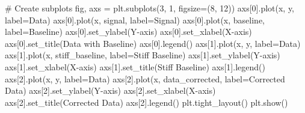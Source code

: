 \documentclass[
  letterpaper,
  DIV=11,
  numbers=noendperiod]{scrreprt}
\newenvironment{Shaded}{\begin{snugshade}}{\end{snugshade}}
\newcommand{\CommentTok}[1]{\textcolor[rgb]{0.37,0.37,0.37}{#1}}
\newcommand{\DecValTok}[1]{\textcolor[rgb]{0.68,0.00,0.00}{#1}}
\newcommand{\NormalTok}[1]{\textcolor[rgb]{0.00,0.23,0.31}{#1}}
\newcommand{\OperatorTok}[1]{\textcolor[rgb]{0.37,0.37,0.37}{#1}}
\newcommand{\StringTok}[1]{\textcolor[rgb]{0.13,0.47,0.30}{#1}}
\begin{document}
\begin{Shaded}
\begin{Highlighting}[]
\CommentTok{\# Create subplots}
\NormalTok{fig, axs }\OperatorTok{=}\NormalTok{ plt.subplots(}\DecValTok{3}\NormalTok{, }\DecValTok{1}\NormalTok{, figsize}\OperatorTok{=}\NormalTok{(}\DecValTok{8}\NormalTok{, }\DecValTok{12}\NormalTok{))}
\NormalTok{axs[}\DecValTok{0}\NormalTok{].plot(x, y, label}\OperatorTok{=}\StringTok{\textquotesingle{}Data\textquotesingle{}}\NormalTok{)}
\NormalTok{axs[}\DecValTok{0}\NormalTok{].plot(x, signal, label}\OperatorTok{=}\StringTok{\textquotesingle{}Signal\textquotesingle{}}\NormalTok{)}
\NormalTok{axs[}\DecValTok{0}\NormalTok{].plot(x, baseline, label}\OperatorTok{=}\StringTok{\textquotesingle{}Baseline\textquotesingle{}}\NormalTok{)}
\NormalTok{axs[}\DecValTok{0}\NormalTok{].set\_ylabel(}\StringTok{\textquotesingle{}Y{-}axis\textquotesingle{}}\NormalTok{)}
\NormalTok{axs[}\DecValTok{0}\NormalTok{].set\_xlabel(}\StringTok{\textquotesingle{}X{-}axis\textquotesingle{}}\NormalTok{)}
\NormalTok{axs[}\DecValTok{0}\NormalTok{].set\_title(}\StringTok{\textquotesingle{}Data with Baseline\textquotesingle{}}\NormalTok{)}
\NormalTok{axs[}\DecValTok{0}\NormalTok{].legend()}
\NormalTok{axs[}\DecValTok{1}\NormalTok{].plot(x, y, label}\OperatorTok{=}\StringTok{\textquotesingle{}Data\textquotesingle{}}\NormalTok{)}
\NormalTok{axs[}\DecValTok{1}\NormalTok{].plot(x, stiff\_baseline, label}\OperatorTok{=}\StringTok{\textquotesingle{}Stiff Baseline\textquotesingle{}}\NormalTok{)}
\NormalTok{axs[}\DecValTok{1}\NormalTok{].set\_ylabel(}\StringTok{\textquotesingle{}Y{-}axis\textquotesingle{}}\NormalTok{)}
\NormalTok{axs[}\DecValTok{1}\NormalTok{].set\_xlabel(}\StringTok{\textquotesingle{}X{-}axis\textquotesingle{}}\NormalTok{)}
\NormalTok{axs[}\DecValTok{1}\NormalTok{].set\_title(}\StringTok{\textquotesingle{}Stiff Baseline\textquotesingle{}}\NormalTok{)}
\NormalTok{axs[}\DecValTok{1}\NormalTok{].legend()}
\NormalTok{axs[}\DecValTok{2}\NormalTok{].plot(x, y, label}\OperatorTok{=}\StringTok{\textquotesingle{}Data\textquotesingle{}}\NormalTok{)}
\NormalTok{axs[}\DecValTok{2}\NormalTok{].plot(x, data\_corrected, label}\OperatorTok{=}\StringTok{\textquotesingle{}Corrected Data\textquotesingle{}}\NormalTok{)}
\NormalTok{axs[}\DecValTok{2}\NormalTok{].set\_ylabel(}\StringTok{\textquotesingle{}Y{-}axis\textquotesingle{}}\NormalTok{)}
\NormalTok{axs[}\DecValTok{2}\NormalTok{].set\_xlabel(}\StringTok{\textquotesingle{}X{-}axis\textquotesingle{}}\NormalTok{)}
\NormalTok{axs[}\DecValTok{2}\NormalTok{].set\_title(}\StringTok{\textquotesingle{}Corrected Data\textquotesingle{}}\NormalTok{)}
\NormalTok{axs[}\DecValTok{2}\NormalTok{].legend()}
\NormalTok{plt.tight\_layout()}
\NormalTok{plt.show()}
\end{Highlighting}
\end{Shaded}
\end{document}
